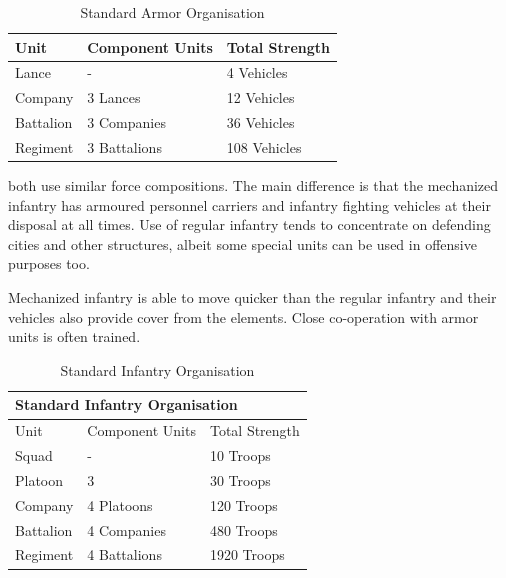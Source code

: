 \documentclass{tufte-book}
\begin{document}
\bigskip
\begin{table}
\begin{minipage}{\textwidth}
\begin{center}
\begin{tabular}{lll}
\toprule
Unit & Component Units & Total Strength \\
\midrule
Lance     & -            & 4 Vehicles \\
Company   & 3 Lances     & 12 Vehicles \\
Battalion & 3 Companies  & 36 Vehicles \\
Regiment  & 3 Battalions & 108 Vehicles \\
\bottomrule
\end{tabular}
\end{center}
\end{minipage}
\caption{Standard Armor Organisation}
\end{table}

 both use similar force
compositions. The main difference is that the mechanized infantry has
armoured personnel carriers and infantry fighting vehicles at their
disposal at all times. Use of regular infantry tends to concentrate on
defending cities and other structures, albeit some special units can be
used in offensive purposes too.

Mechanized infantry is able to move quicker than the regular infantry
and their vehicles also provide cover from the elements. Close
co-operation with armor units is often trained.

\bigskip
\begin{table}
\begin{minipage}{\textwidth}
\begin{center}
\begin{tabular}{lll}
\toprule
\multicolumn{3}{l}{Standard Infantry Organisation} \\
\midrule
Unit & Component Units & Total Strength \\
\midrule
Squad     & -            & 10 Troops \\
Platoon   & 3            & 30 Troops \\
Company   & 4 Platoons   & 120 Troops \\
Battalion & 4 Companies  & 480 Troops \\
Regiment  & 4 Battalions & 1920 Troops \\
\bottomrule
\end{tabular}
\end{center}
\end{minipage}
\caption{Standard Infantry Organisation}
\end{table}
\end{document}
